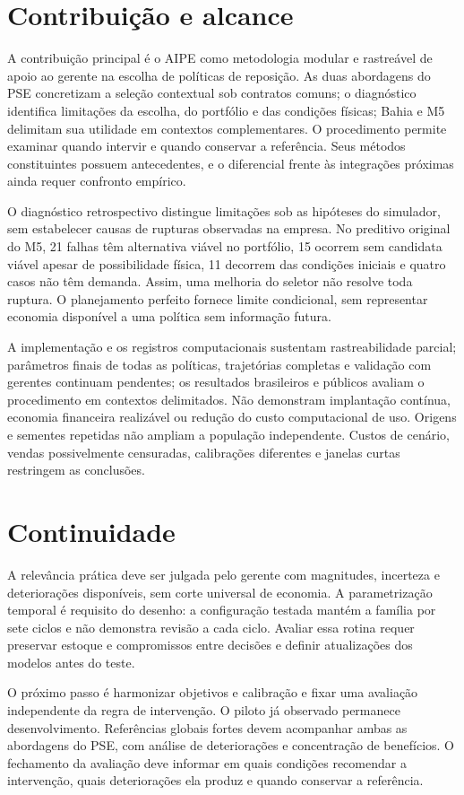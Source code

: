 \section{Contribuição e alcance}
A contribuição principal é o AIPE como metodologia modular e rastreável de apoio ao gerente na escolha de políticas de reposição. As duas abordagens do PSE concretizam a seleção contextual sob contratos comuns; o diagnóstico identifica limitações da escolha, do portfólio e das condições físicas; Bahia e M5 delimitam sua utilidade em contextos complementares. O procedimento permite examinar quando intervir e quando conservar a referência. Seus métodos constituintes possuem antecedentes, e o diferencial frente às integrações próximas ainda requer confronto empírico.

O diagnóstico retrospectivo distingue limitações sob as hipóteses do simulador, sem estabelecer causas de rupturas observadas na empresa. No preditivo original do M5, 21 falhas têm alternativa viável no portfólio, 15 ocorrem sem candidata viável apesar de possibilidade física, 11 decorrem das condições iniciais e quatro casos não têm demanda. Assim, uma melhoria do seletor não resolve toda ruptura. O planejamento perfeito fornece limite condicional, sem representar economia disponível a uma política sem informação futura.

A implementação e os registros computacionais sustentam rastreabilidade parcial; parâmetros finais de todas as políticas, trajetórias completas e validação com gerentes continuam pendentes; os resultados brasileiros e públicos avaliam o procedimento em contextos delimitados. Não demonstram implantação contínua, economia financeira realizável ou redução do custo computacional de uso. Origens e sementes repetidas não ampliam a população independente. Custos de cenário, vendas possivelmente censuradas, calibrações diferentes e janelas curtas restringem as conclusões.

\section{Continuidade}
A relevância prática deve ser julgada pelo gerente com magnitudes, incerteza e deteriorações disponíveis, sem corte universal de economia. A parametrização temporal é requisito do desenho: a configuração testada mantém a família por sete ciclos e não demonstra revisão a cada ciclo. Avaliar essa rotina requer preservar estoque e compromissos entre decisões e definir atualizações dos modelos antes do teste.

O próximo passo é harmonizar objetivos e calibração e fixar uma avaliação independente da regra de intervenção. O piloto já observado permanece desenvolvimento. Referências globais fortes devem acompanhar ambas as abordagens do PSE, com análise de deteriorações e concentração de benefícios. O fechamento da avaliação deve informar em quais condições recomendar a intervenção, quais deteriorações ela produz e quando conservar a referência.

